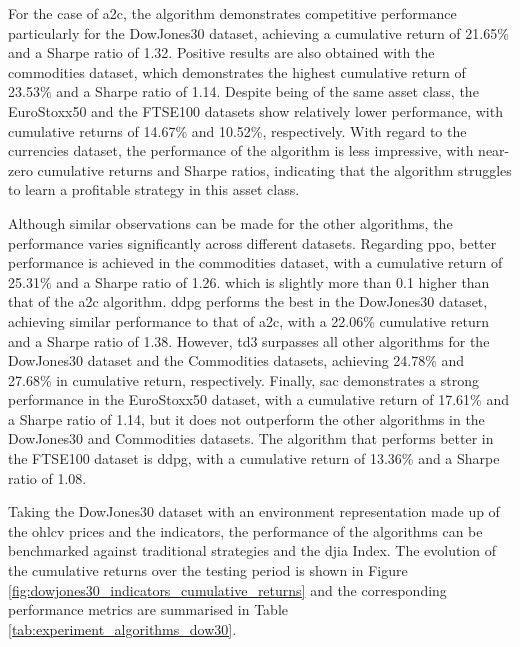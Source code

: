 

For the case of \acrshort{a2c}, the algorithm demonstrates competitive performance particularly for the DowJones30 dataset, achieving a cumulative return of 21.65\% and a Sharpe ratio of 1.32. Positive results are also obtained with the commodities dataset, which demonstrates the highest cumulative return of 23.53\% and a Sharpe ratio of 1.14. Despite being of the same asset class, the EuroStoxx50 and the FTSE100 datasets show relatively lower performance, with cumulative returns of 14.67\% and 10.52\%, respectively. With regard to the currencies dataset, the performance of the algorithm is less impressive, with near-zero cumulative returns and Sharpe ratios, indicating that the algorithm struggles to learn a profitable strategy in this asset class.

Although similar observations can be made for the other algorithms, the performance varies significantly across different datasets. Regarding \acrshort{ppo}, better performance is achieved in the commodities dataset, with a cumulative return of 25.31\% and a Sharpe ratio of 1.26. which is slightly more than 0.1 higher than that of the \acrshort{a2c} algorithm. \acrshort{ddpg} performs the best in the DowJones30 dataset, achieving similar performance to that of \acrshort{a2c}, with a 22.06\% cumulative return and a Sharpe ratio of 1.38. However, \acrshort{td3} surpasses all other algorithms for the DowJones30 dataset and the Commodities datasets, achieving 24.78\% and 27.68\% in cumulative return, respectively. Finally, \acrshort{sac} demonstrates a strong performance in the EuroStoxx50 dataset, with a cumulative return of 17.61\% and a Sharpe ratio of 1.14, but it does not outperform the other algorithms in the DowJones30 and Commodities datasets. The algorithm that performs better in the FTSE100 dataset is \acrshort{ddpg}, with a cumulative return of 13.36\% and a Sharpe ratio of 1.08.

Taking the DowJones30 dataset with an environment representation made up of the \acrshort{ohlcv} prices and the indicators, the performance of the algorithms can be benchmarked against traditional strategies and the \acrshort{djia} Index. The evolution of the cumulative returns over the testing period is shown in Figure \ref{fig:dowjones30_indicators_cumulative_returns} and the corresponding performance metrics are summarised in Table \ref{tab:experiment_algorithms_dow30}.

